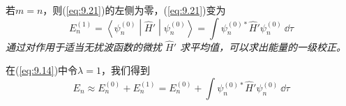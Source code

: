     若$m=n$，则(\ref{eq:9.21})的左侧为零，(\ref{eq:9.21})变为
    \begin{equation}
        \boxed{
            E_n^{\left(1\right)} = \left\langle \psi_n^{\left(0\right)} \middle| \hat{H}' \middle| \psi_n^{\left(0\right)} \right\rangle = \int \psi_n^{\left(0\right)\ast} \hat{H}' \psi_n^{\left(0\right)} \:\dd \tau
        }
        \label{eq:9.22}
    \end{equation}
    \textit{通过对作用于适当无扰波函数的微扰 $\hat{H}'$ 求平均值，可以求出能量的一级校正。}

    在(\ref{eq:9.14})中令$\lambda=1$，我们得到
    \begin{equation}
        E_n \approx E_n^{\left(0\right)} + E_n^{\left(1\right)} = E_n^{\left(0\right)} + \int \psi_n^{\left(0\right)\ast} \hat{H}' \psi_n^{\left(0\right)} \:\dd \tau
        \label{eq:9.23}
    \end{equation}

